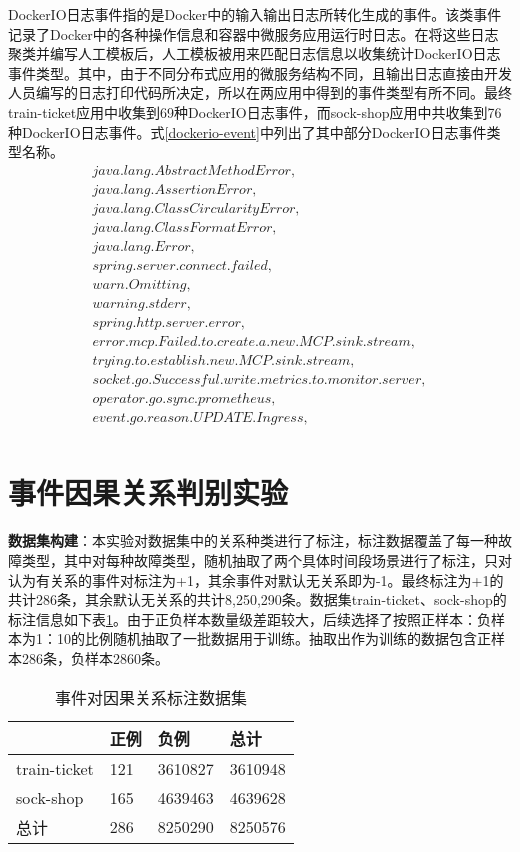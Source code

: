 DockerIO日志事件指的是Docker中的输入输出日志所转化生成的事件。该类事件记录了Docker\cite{boettiger2015introduction}中的各种操作信息和容器中微服务应用运行时日志。在将这些日志聚类并编写人工模板后，人工模板被用来匹配日志信息以收集统计DockerIO日志事件类型。其中，由于不同分布式应用的微服务结构不同，且输出日志直接由开发人员编写的日志打印代码所决定，所以在两应用中得到的事件类型有所不同。最终train-ticket应用中收集到69种DockerIO日志事件，而sock-shop应用中共收集到76种DockerIO日志事件。式\ref{dockerio-event}中列出了其中部分DockerIO日志事件类型名称。
\begin{equation}
    \begin{array}{l}
        java.lang.AbstractMethodError,\\
        java.lang.AssertionError,\\
        java.lang.ClassCircularityError,\\
        java.lang.ClassFormatError,\\
        java.lang.Error,\\
        spring.server.connect.failed,\\
        warn.Omitting,\\
        warning.stderr,\\
        spring.http.server.error,\\
        error.mcp.Failed.to.create.a.new.MCP.sink.stream,\\
        trying.to.establish.new.MCP.sink.stream,\\
        socket.go.Successful.write.metrics.to.monitor.server,\\
        operator.go.sync.prometheus,\\
        event.go.reason.UPDATE.Ingress,\\
    \end{array}
    \label{dockerio-event}
\end{equation}

\section{事件因果关系判别实验}
\textbf{数据集构建}：本实验对数据集中的关系种类进行了标注，标注数据覆盖了每一种故障类型，其中对每种故障类型，随机抽取了两个具体时间段场景进行了标注，只对认为有关系的事件对标注为+1，其余事件对默认无关系即为-1。最终标注为+1的共计286条，其余默认无关系的共计8,250,290‬条。数据集train-ticket、sock-shop的标注信息如下表\ref{event-cause-label}。由于正负样本数量级差距较大，后续选择了按照正样本：负样本为1：10的比例随机抽取了一批数据用于训练。抽取出作为训练的数据包含正样本286条，负样本2860条。
\begin{table}[htbp]
    \caption{事件对因果关系标注数据集}
    \centering
    \label{event-cause-label}
    \begin{tabular}{llll}
    \hline
                 & 正例  & 负例      & 总计      \\ \hline
    train-ticket & 121 & 3610827 & 3610948 \\
    sock-shop    & 165 & 4639463 & 4639628 \\ \hline
    总计           & 286 & 8250290 & 8250576 \\ \hline
    \end{tabular}
    \end{table}

